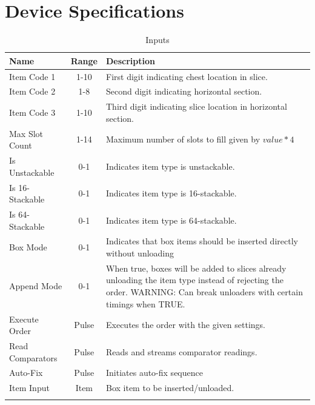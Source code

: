 \documentclass[10pt]{datasheet}
\begin{document}
\onecolumn
\section{Device Specifications}

\begin{table}[h]
    \caption{Inputs}
    \begin{tabularx}{\textwidth}{l | c | X}
        \thickhline
        \textbf{Name} & \textbf{Range} & \textbf{Description} \\
        \hline
        Item Code 1 & 1-10 & First digit indicating chest location in slice. \\
        Item Code 2 & 1-8 & Second digit indicating horizontal section. \\
        Item Code 3 & 1-10 & Third digit indicating slice location in horizontal section. \\
        \hline
        Max Slot Count & 1-14 & Maximum number of slots to fill given by $value*4$\\
        \hline
        Is Unstackable & 0-1 & Indicates item type is unstackable.\\
        Is 16-Stackable & 0-1 & Indicates item type is 16-stackable.\\
        Is 64-Stackable & 0-1 & Indicates item type is 64-stackable.\\
        \hline
        Box Mode & 0-1 & Indicates that box items should be inserted directly without unloading\\
        \hline
        Append Mode & 0-1 & When true, boxes will be added to slices already unloading the item type instead of rejecting the order. WARNING: Can break unloaders with certain timings when TRUE. \\
        \hline
        Execute Order & Pulse & Executes the order with the given settings. \\
        Read Comparators & Pulse & Reads and streams comparator readings. \\
        Auto-Fix & Pulse & Initiates auto-fix sequence \\
        \hline
        Item Input & Item & Box item to be inserted/unloaded. \\
        \thickhline
\end{tabularx}
\end{table}
\end{document}

